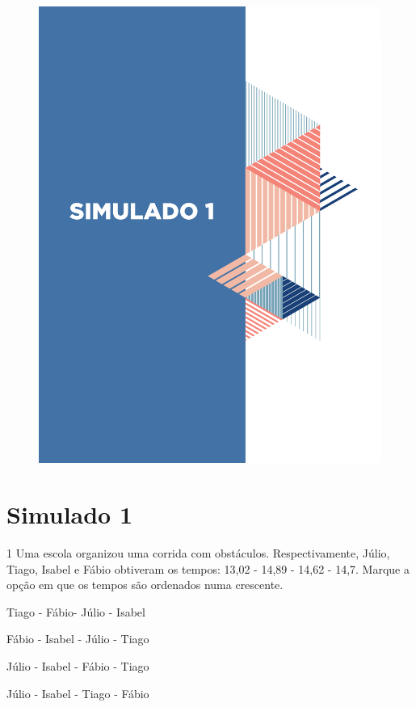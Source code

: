\pagebreak

\mbox{}

\begin{figure}
\vspace*{-3cm}
\hspace*{-3.7cm}\includegraphics[scale=1]{../watermarks/1simulado9ano.pdf}
\end{figure}


\pagebreak

\section*{Simulado 1}

\num{1} Uma escola organizou uma corrida com obstáculos. Respectivamente,
Júlio, Tiago, Isabel e Fábio obtiveram os tempos:
13,02  - 14,89  - 14,62  - 14,7. Marque a opção em que os
tempos são ordenados numa crescente.

\begin{escolha}
\item Tiago - Fábio- Júlio - Isabel
\item Fábio - Isabel - Júlio - Tiago
\item Júlio - Isabel - Fábio - Tiago
\item Júlio - Isabel - Tiago - Fábio
\end{escolha}

